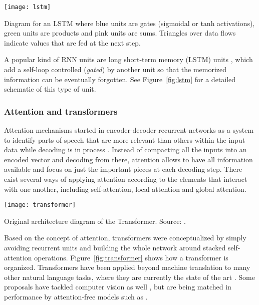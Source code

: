 \begin{marginfigure}
    \texttt{[image: lstm]}
    \caption[Diagram for an LSTM.]{\label{fig:lstm}Diagram for an LSTM where blue units are gates (sigmoidal or tanh activations), green units are products and pink units are sums. Triangles over data flows indicate values that are fed at the next step.}
\end{marginfigure}

A popular kind of RNN units are long short-term memory (LSTM) units , which add a self-loop controlled (\textit{gated}) by another unit so that the memorized information can be eventually forgotten. See Figure~\ref{fig:lstm} for a detailed schematic of this type of unit.


\subsubsection{Attention and transformers}

Attention mechanisms started in encoder-decoder recurrent networks as a system to identify parts of speech that are more relevant than others within the input data while decoding is in process . Instead of compacting all the inputs into an encoded vector and decoding from there, attention allows to have all information available and focus on just the important pieces at each decoding step. There exist several ways of applying attention according to the elements that interact with one another, including self-attention, local attention and global attention.

\begin{marginfigure}
    \texttt{[image: transformer]}
    \caption[Original architecture diagram of the Transformer.]{\label{fig:transformer}Original architecture diagram of the Transformer. Source: \cite{vaswani2017attention}.}
\end{marginfigure}

Based on the concept of attention, transformers  were conceptualized by simply avoiding recurrent units and building the whole network around stacked self-attention operations. Figure~\ref{fig:transformer} shows how a transformer is organized. 
Transformers have been applied beyond machine translation to many other natural language tasks, where they are currently the state of the art . Some proposals have tackled computer vision as well , but are being matched in performance by attention-free models such as .

